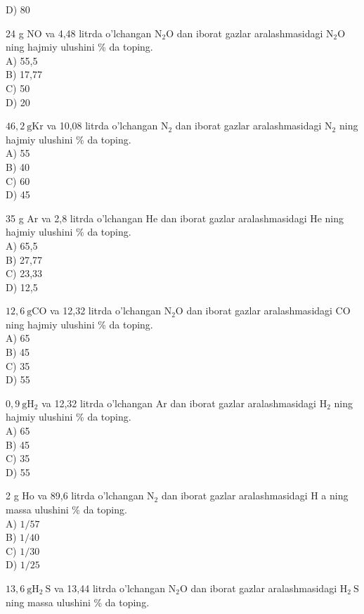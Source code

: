 D) 80
  \item 24 g NO va 4,48 litrda o'lchangan $\mathrm{N}_{2} \mathrm{O}$ dan iborat gazlar aralashmasidagi $\mathrm{N}_{2} \mathrm{O}$ ning hajmiy ulushini \% da toping.\\
A) 55,5\\
B) 17,77\\
C) 50\\
D) 20
  \item $46,2 \mathrm{~g} \mathrm{Kr}$ va 10,08 litrda o'lchangan $\mathrm{N}_{2}$ dan iborat gazlar aralashmasidagi $\mathrm{N}_{2}$ ning hajmiy ulushini \% da toping.\\
A) 55\\
B) 40\\
C) 60\\
D) 45
  \item 35 g Ar va 2,8 litrda o'lchangan He dan iborat gazlar aralashmasidagi He ning hajmiy ulushini \% da toping.\\
A) 65,5\\
B) 27,77\\
C) 23,33\\
D) 12,5
  \item $12,6 \mathrm{~g} \mathrm{CO}$ va 12,32 litrda o'lchangan $\mathrm{N}_{2} \mathrm{O}$ dan iborat gazlar aralashmasidagi CO ning hajmiy ulushini \% da toping.\\
A) 65\\
B) 45\\
C) 35\\
D) 55
  \item $0,9 \mathrm{~g} \mathrm{H}_{2}$ va 12,32 litrda o'lchangan Ar dan iborat gazlar aralashmasidagi $\mathrm{H}_{2}$ ning hajmiy ulushini \% da toping.\\
A) 65\\
B) 45\\
C) 35\\
D) 55
  \item 2 g Ho va 89,6 litrda o'lchangan $\mathrm{N}_{2}$ dan iborat gazlar aralashmasidagi H a ning massa ulushini \% da toping.\\
A) $1 / 57$\\
B) $1 / 40$\\
C) $1 / 30$\\
D) $1 / 25$\\
  \item $13,6 \mathrm{~g} \mathrm{H}_{2} \mathrm{~S}$ va 13,44 litrda o'lchangan $\mathrm{N}_{2} \mathrm{O}$ dan iborat gazlar aralashmasidagi $\mathrm{H}_{2} \mathrm{~S}$ ning massa ulushini \% da toping.\\
